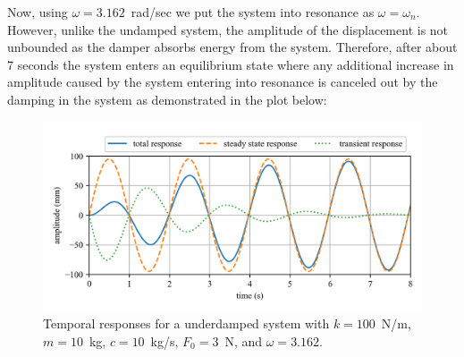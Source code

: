 \documentclass[12pt,letter]{article}
\begin{document}
\begin{example}
		\noindent  Now, using $\omega=3.162$~rad/sec we put the system into resonance as $\omega=\omega_n$. However, unlike the undamped system, the amplitude of the displacement is not unbounded as the damper absorbs energy from the system. Therefore, after about 7 seconds the system enters an equilibrium state where any additional increase in amplitude caused by the system entering into resonance is canceled out by the damping in the system as demonstrated in the plot below:
		\begin{figure}[H]
			\centering
			\includegraphics[]{../figures/homogeneous_and_particular_solutions_in_resonance_c.png}
			\caption{Temporal responses for a underdamped system with $k=100$~N/m, $m=10$~kg,  $c=10$~kg/s, $F_0=3$~N, and $\omega = 3.162$.}
		\end{figure}				
	\end{example}	
\end{document}
